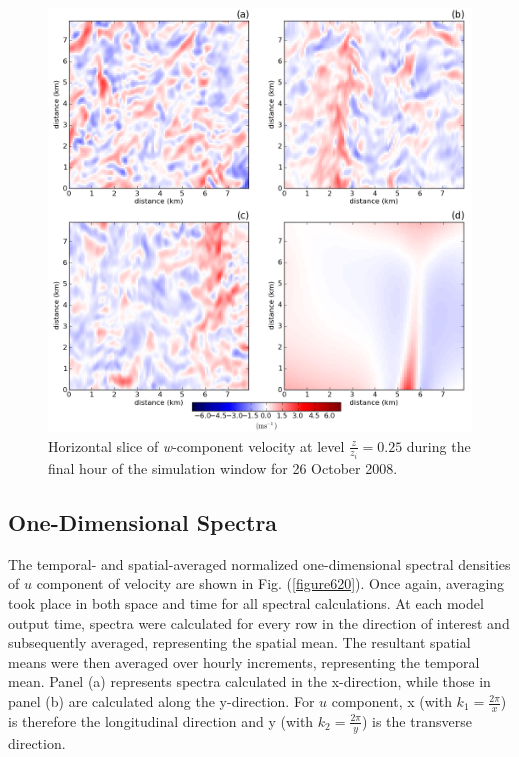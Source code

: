 \begin{figure}[H]
\begin{center}
\includegraphics[width=\textwidth]{figures/chapter6/w_slice_20081026}
\end{center}
\caption{Horizontal slice of \textit{w}-component velocity at level $\frac{z}{z_i} = 0.25$ during the final hour of the simulation window for 26 October 2008.}
\label{figure619}
\end{figure}


\subsection{One-Dimensional Spectra}
\label{spec1d-633}

The temporal- and spatial-averaged normalized one-dimensional spectral densities of $u$ component of velocity are shown in Fig. (\autoref{figure620}). Once again, averaging took place in both space and time for all spectral calculations. At each model output time, spectra were calculated for every row in the direction of interest and subsequently averaged, representing the spatial mean. The resultant spatial means were then averaged over hourly increments, representing the temporal mean. Panel (a) represents spectra calculated in the x-direction, while those in panel (b) are calculated along the y-direction. For $u$ component, x (with $k_1 = \frac{2\pi}{x}$) is therefore the longitudinal direction and y (with $k_2 = \frac{2\pi}{y}$) is the transverse direction. 


